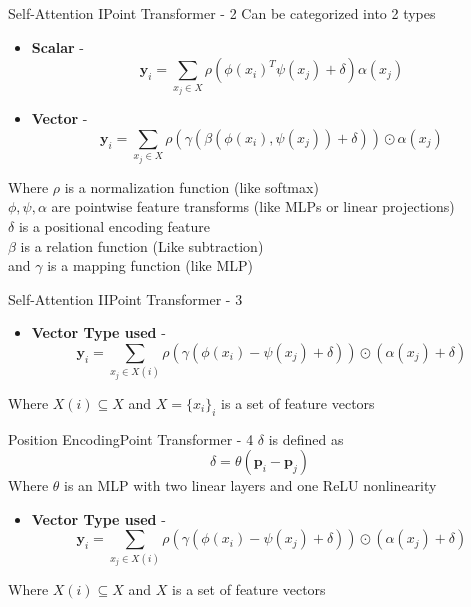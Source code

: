 \documentclass{beamer}
\begin{document}
		\begin{frame}{Self-Attention I}{Point Transformer - 2}
			Can be categorized into 2 types
			\begin{itemize}
				\item \textbf{Scalar} - \[\mathbf{y}_i = \sum_{x_j \in X} \rho\left( \phi(x_i)^T \psi(x_j) + \delta \right) \alpha(x_j)\]
				\item \textbf{Vector} - \[\mathbf{y}_i = \sum_{x_j \in X} \rho\left( \gamma \left(\beta(\phi(x_i),\psi(x_j)) + \delta\right) \right)\odot \alpha(x_j)\]
			\end{itemize}
            Where $\rho$ is a normalization function (like softmax)\\
            $\phi, \psi, \alpha$ are pointwise feature transforms (like MLPs or linear projections)\\ 
            $\delta$ is a positional encoding feature\\
            $\beta$ is a relation function (Like subtraction)\\
            and $\gamma$ is a mapping function (like MLP)
		\end{frame}

		\begin{frame}{Self-Attention II}{Point Transformer - 3}
			\begin{itemize}
				\item \textbf{Vector Type used} - \[\mathbf{y}_i = \sum_{x_j \in X(i)} \rho\left( \gamma \left(\phi(x_i) -\psi(x_j) + \delta\right) \right)\odot (\alpha(x_j)+\delta)\] 
			\end{itemize}
            Where $X(i) \subseteq X$ and $X=\{x_i\}_i$ is a set of feature vectors
        \end{frame}

        \begin{frame}{Position Encoding}{Point Transformer - 4}
			$\delta$ is defined as \[\delta = \theta(\mathbf{p}_i - \mathbf{p}_j)\]
            Where $\theta$ is an MLP with two linear layers and one ReLU nonlinearity
			\begin{itemize}
				\item \textbf{Vector Type used} - \[\mathbf{y}_i = \sum_{x_j \in X(i)} \rho\left( \gamma \left(\phi(x_i) -\psi(x_j) + \delta\right) \right)\odot (\alpha(x_j)+\delta)\] 
			\end{itemize}
            Where $X(i) \subseteq X$ and $X$ is a set of feature vectors
        \end{frame}
\end{document}
